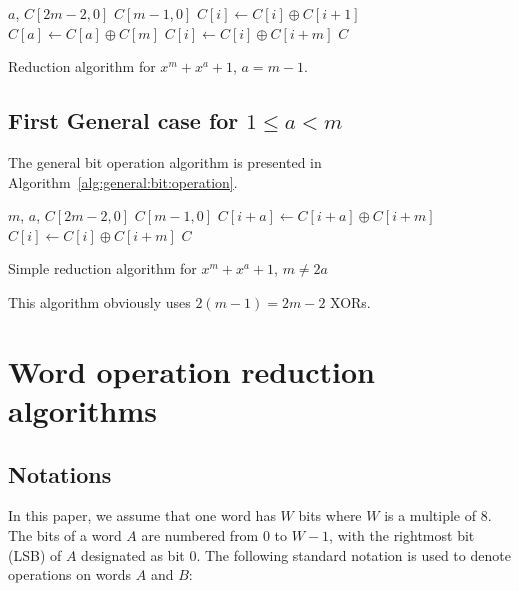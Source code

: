\begin{algorithm}
\begin{algorithmic}[1]
  \REQUIRE $a$, $C[2m-2,0]$
  \ENSURE $C[m-1,0]$
    \STATE $C[i] \gets C[i] \oplus C[i+1]$
    \ENDFOR
  \STATE $C[a] \gets C[a] \oplus C[m]$ 
    \STATE $C[i] \gets C[i] \oplus C[i+m]$
  \ENDFOR
  \RETURN $C$
  \caption{Reduction algorithm for $x^{m} + x^a +1$, $a=m-1$.}
  \label{alg:ma1}
\end{algorithmic}
\end{algorithm}

\subsection{First General case for $1 \leq a < m$}
The general bit operation algorithm is presented in Algorithm~\ref{alg:general:bit:operation}.

\begin{algorithm}
\begin{algorithmic}[1]
  \REQUIRE $m$, $a$, $C[2m-2,0]$
  \ENSURE $C[m-1,0]$
      \STATE $C[i+a] \gets C[i+a] \oplus C[i+m]$
      \STATE $C[i] \gets C[i] \oplus C[i+m]$
  \ENDFOR
  \RETURN $C$
  \caption{Simple reduction algorithm for $x^m + x^a +1$, $m \not = 2a$}
  \label{alg:general:bit:operation}
\end{algorithmic}
\end{algorithm}

This algorithm obviously uses $2 (m - 1) = 2m -2$ XORs.

\section{Word operation reduction algorithms}

\subsection{Notations}
In this paper, we assume that one word has $W$ bits where $W$ is a multiple of $8$. The bits of a word $A$ are numbered from $0$ to $W-1$, with the rightmost bit (LSB) of $A$ designated as bit $0$. The following standard notation is used to denote operations on words $A$ and $B$:\\

